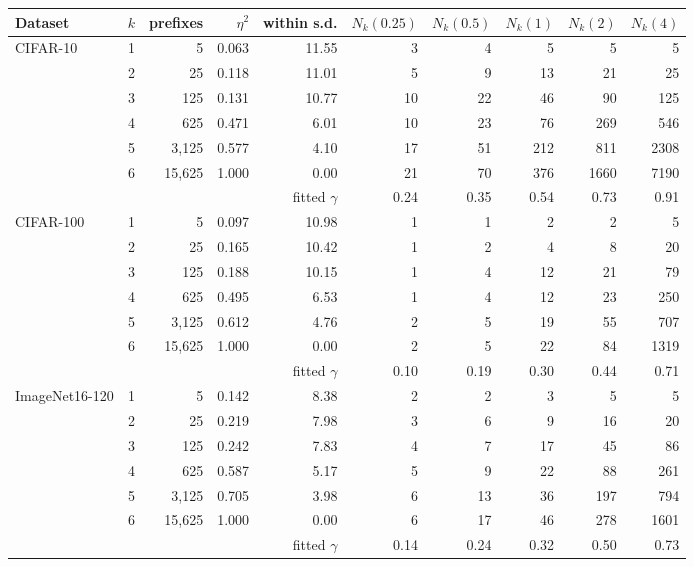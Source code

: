 \begin{tabular}{@{}lrrrrrrrrr@{}}
\toprule
Dataset & $k$ & prefixes & $\eta^2$ & within s.d. & $N_k(0.25)$ & $N_k(0.5)$ & $N_k(1)$ & $N_k(2)$ & $N_k(4)$\\
\midrule
CIFAR-10 & 1 & 5 & 0.063 & 11.55 & 3 & 4 & 5 & 5 & 5\\
 & 2 & 25 & 0.118 & 11.01 & 5 & 9 & 13 & 21 & 25\\
 & 3 & 125 & 0.131 & 10.77 & 10 & 22 & 46 & 90 & 125\\
 & 4 & 625 & 0.471 & 6.01 & 10 & 23 & 76 & 269 & 546\\
 & 5 & 3,125 & 0.577 & 4.10 & 17 & 51 & 212 & 811 & 2308\\
 & 6 & 15,625 & 1.000 & 0.00 & 21 & 70 & 376 & 1660 & 7190\\
 & \multicolumn{4}{r}{fitted $\gamma$} & 0.24 & 0.35 & 0.54 & 0.73 & 0.91\\
\midrule
CIFAR-100 & 1 & 5 & 0.097 & 10.98 & 1 & 1 & 2 & 2 & 5\\
 & 2 & 25 & 0.165 & 10.42 & 1 & 2 & 4 & 8 & 20\\
 & 3 & 125 & 0.188 & 10.15 & 1 & 4 & 12 & 21 & 79\\
 & 4 & 625 & 0.495 & 6.53 & 1 & 4 & 12 & 23 & 250\\
 & 5 & 3,125 & 0.612 & 4.76 & 2 & 5 & 19 & 55 & 707\\
 & 6 & 15,625 & 1.000 & 0.00 & 2 & 5 & 22 & 84 & 1319\\
 & \multicolumn{4}{r}{fitted $\gamma$} & 0.10 & 0.19 & 0.30 & 0.44 & 0.71\\
\midrule
ImageNet16-120 & 1 & 5 & 0.142 & 8.38 & 2 & 2 & 3 & 5 & 5\\
 & 2 & 25 & 0.219 & 7.98 & 3 & 6 & 9 & 16 & 20\\
 & 3 & 125 & 0.242 & 7.83 & 4 & 7 & 17 & 45 & 86\\
 & 4 & 625 & 0.587 & 5.17 & 5 & 9 & 22 & 88 & 261\\
 & 5 & 3,125 & 0.705 & 3.98 & 6 & 13 & 36 & 197 & 794\\
 & 6 & 15,625 & 1.000 & 0.00 & 6 & 17 & 46 & 278 & 1601\\
 & \multicolumn{4}{r}{fitted $\gamma$} & 0.14 & 0.24 & 0.32 & 0.50 & 0.73\\
\bottomrule
\end{tabular}
